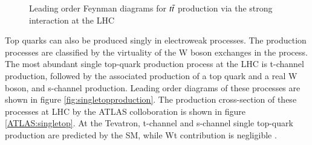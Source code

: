 \begin{figure}[h!]
\begin{subfigure}[b]{0.33\linewidth}
  \caption{}
  \label{fig:vittt}
  \end{subfigure}%
  \caption{Leading order Feynman diagrams for $t\Bar{t}$ production via the strong interaction at the LHC}
  \label{fig:ttbarproduction}
  \end{figure}


Top quarks can also be produced singly in electroweak processes. The production processes are classified by the virtuality of the W boson exchanges in the process. The most abundant single top-quark production process at the LHC is t-channel production, followed by the associated production of a top quark and a real W boson, and s-channel production. Leading order diagrams of these processes are shown in figure \ref{fig:singletopproduction}. The production cross-section of these processes at LHC by the ATLAS colloboration is shown in figure \ref{ATLAS:singletop}. At the Tevatron, t-channel and s-channel single top-quark production are predicted by the SM, while Wt contribution is negligible \cite{singtop2014}.

